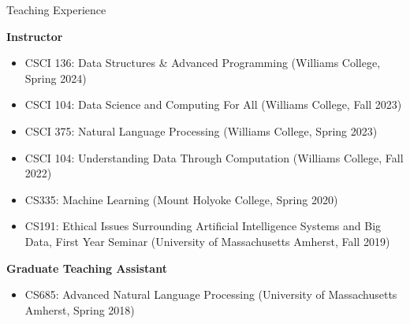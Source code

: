\documentclass{resume} %
\begin{document}

\begin{rSection}{Teaching Experience}

\textbf{Instructor}
\begin{itemize}
  \item CSCI 136: Data Structures \& Advanced Programming (Williams College, Spring 2024)
  \item CSCI 104: Data Science and Computing For All (Williams College, Fall 2023)
  \item CSCI 375: Natural Language Processing (Williams College, Spring 2023)
  \item CSCI 104: Understanding Data Through Computation (Williams College, Fall 2022)
  \item CS335: Machine Learning (Mount Holyoke College, Spring 2020)
  \item CS191: Ethical Issues Surrounding Artificial Intelligence Systems and Big Data, First Year Seminar (University of Massachusetts Amherst, Fall 2019)

\end{itemize}

\textbf{Graduate Teaching Assistant}
\begin{itemize}
\item CS685: Advanced Natural Language Processing (University of Massachusetts Amherst, Spring 2018)
\end{itemize}




\end{rSection}
\end{document}
